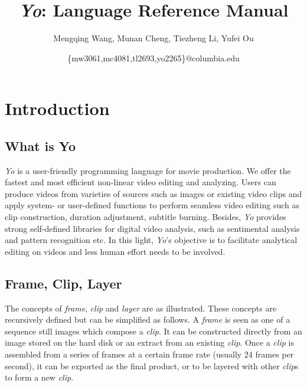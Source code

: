 \documentclass[12pt]{article}
\title{\textit{Yo}: Language Reference Manual}
\author{Mengqing Wang, Munan Cheng, Tiezheng Li, Yufei Ou}
\date{\{mw3061,mc4081,tl2693,yo2265\}@columbia.edu}
\begin{document}
\maketitle
\tableofcontents

\section{Introduction}
\subsection{What is Yo}
\textit{Yo} is a user-friendly programming language for movie production. We offer the fastest and most efficient non-linear video editing and analyzing. Users can produce videos from varieties of sources such as images or existing video clips and apply system- or user-defined functions to perform seamless video editing such as clip construction, duration adjustment, subtitle burning. Besides, \textit{Yo} provides strong self-defined libraries for digital video analysis, such as sentimental analysis and pattern recognition etc. In this light, \textit{Yo}'s objective is to facilitate analytical editing on videos and less human effort needs to be involved.

\subsection{Frame, Clip, Layer}

The concepts of \textit{frame}, \textit{clip} and \textit{layer} are as illustrated. These concepts are recursively defined but can be simplified as follows. A \textit{frame} is seen as one of a sequence still images which compose a \textit{clip}. It can be constructed directly from an image stored on the hard disk or an extract from an existing \textit{clip}. Once a \textit{clip} is assembled from a series of frames at a certain frame rate (usually 24 frames per second), it can be exported as the final product, or to be layered with other \textit{clip}s to form a new \textit{clip}.
\end{document}
